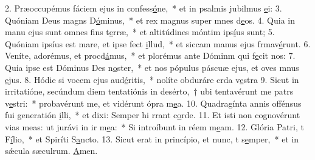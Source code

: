 2. Præoccupémus fáciem ejus in confess\uline{ó}ne,~* et in psalmis jubilmus \uline{e}i:
3. Quóniam Deus magns D\uline{ó}minus,~* et rex magnus super mnes d\uline{e}os.
4. Quia in manu ejus sunt omnes fins t\uline{e}rræ,~* et altitúdines móntim ips\uline{í}us sunt;
5. Quóniam ipsíus est mare, et ipse fect \uline{i}llud,~* et siccam manus ejus frmav\uline{é}runt.
6. Veníte, adorémus, et procd\uline{á}mus,~* et plorémus ante Dóminm qui f\uline{e}cit nos:
7. Quia ipse est Dóminus Des n\uline{o}ster,~* et nos pópulus páscuæ ejus, et oves mnus \uline{e}jus.
8. Hódie si vocem ejus aud\uline{é}ritis,~* nolíte obduráre crda v\uline{e}stra
9. Sicut in irritatióne, secúndum diem tentatiónis in desérto,~† ubi tentavérunt me patrs v\uline{e}stri:~* probavérunt me, et vidérunt ópra m\uline{e}a.
10. Quadragínta annis offénsus fui generatión \uline{i}lli,~* et dixi: Semper hi rrant c\uline{o}rde.
11. Et isti non cognovérunt vias meas: ut jurávi in ir m\uline{e}a:~* Si introíbunt in réem m\uline{e}am.
12. Glória Patri, t F\uline{í}lio,~* et Spiríti S\uline{a}ncto.
13. Sicut erat in princípio, et nunc, t s\uline{e}mper,~* et in sǽcula sæculrum. \uline{A}men.
